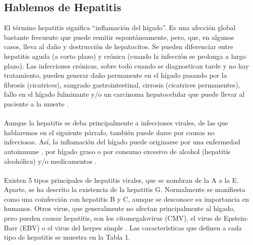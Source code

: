 \documentclass[11 pt]{article}
\begin{document}
\subsection{Hablemos de Hepatitis}
El término hepatitis significa “inflamación del hígado”. Es una afección global bastante frecuente que puede remitir espontáneamente, pero, que, en algunos casos, lleva al daño y destrucción de hepatocitos. Se pueden diferenciar entre hepatitis aguda (a corto plazo) y crónica (cuando la infección se prolonga a largo plazo). Las infecciones crónicas, sobre todo cuando se diagnostican tarde y no hay tratamiento, pueden generar daño permanente en el hígado pasando por la fibrosis (cicatrices), sangrado gastrointestinal, cirrosis (cicatrices permanentes), fallo en el hígado fulminante y/o un carcinoma hepatocelular que puede llevar al paciente a la muerte \cite{Mehta2020}.\\\\
Aunque la hepatitis se deba principalmente a infecciones virales, de las que hablaremos en el siguiente párrafo, también puede darse por causas no infecciosas. Así, la inflamación del hígado puede originarse por una enfermedad autoinmune \cite{Liberal2013}, por hígado graso \cite{NeuschwanderTetri2017} o por consumo excesivo de alcohol (hepatitis alcohólica) \cite{Chayanupatkul2014} y/o medicamentos \cite{Alempijevic2017}.\\\\
Existen 5 tipos principales de hepatitis virales, que se nombran de la A a la E. Aparte, se ha descrito la existencia de la hepatitis G. Normalmente se manifiesta como una coinfección con hepatitis B y C, aunque se desconoce su importancia en humanos. Otros virus, que generalmente no afectan principalmente al hígado, pero pueden causar hepatitis, son los citomegalovirus (CMV), el virus de Epstein-Barr (EBV) o el virus del herpes simple \cite{Mehta2020}. Las características que definen a cada tipo de hepatitis se muestra en la Tabla 1.
\end{document}

